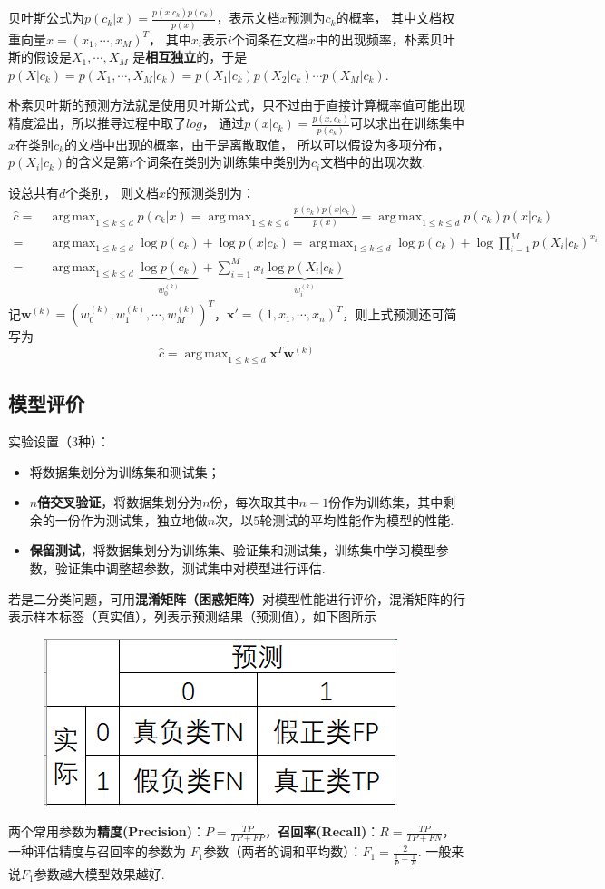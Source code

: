 \documentclass[12pt, a4paper, oneside]{ctexart}
\numberwithin{equation}{section}  %
\DeclareMathOperator*{\argmax}{arg\,max}  %
\let\leq=\leqslant %
\def\bd{\boldsymbol}        %
\def\add{\vspace{1ex}}      %
\begin{document}
贝叶斯公式为$p(c_k|x) = \frac{p(x|c_k)p(c_k)}{p(x)}$，\add 表示文档$x$预测为$c_k$的概率，
其中文档权重向量$x = (x_1,\cdots,x_M)^T$，
其中$x_i$表示$i$个词条在文档$x$中的出现频率，朴素贝叶斯的假设是$X_1,\cdots,X_M$
是\textbf{相互独立}的，于是$p(X|c_k) = p(X_1,\cdots,X_M|c_k) = p(X_1|c_k)p(X_2|c_k)\cdots p(X_M|c_k)$.

朴素贝叶斯的预测方法就是使用贝叶斯公式，\add 只不过由于直接计算概率值可能出现精度溢出，所以推导过程中取了$log$，
通过$p(x|c_k) = \frac{p(x,c_k)}{p(c_k)}$\add 可以求出在训练集中$x$在类别$c_k$的文档中出现的概率，由于是离散取值，
所以可以假设为多项分布，$p(X_i|c_k)$的含义是第$i$个词条在类别为训练集中类别为$c_i$文档中的出现次数.

设总共有$d$个类别，
则文档$x$的预测类别为：
\begin{align*}
    \hat{c} =&\ \argmax_{1\leq k\leq d}p(c_k|x) = \argmax_{1\leq k\leq d}\frac{p(c_k)p(x|c_k)}{p(x)} = \argmax_{1\leq k\leq d}p(c_k)p(x|c_k)\\
    =&\ \argmax_{1\leq k\leq d}\log p(c_k) + \log p(x|c_k) = \argmax_{1\leq k\leq d}\log p(c_k) + \log\prod_{i=1}^Mp(X_i|c_k)^{x_i}\\
    =&\ \argmax_{1\leq k\leq d}\underbrace{\log p(c_k)}_{w_0^{(k)}} + \sum_{i=1}^Mx_i\underbrace{\log p(X_i|c_k)}_{w_i^{(k)}}
\end{align*}
记$\bd{w}^{(k)} = (w_0^{(k)}, w_1^{(k)},\cdots, w_M^{(k)})^T$，$\bd{x}'=(1,x_1,\cdots,x_n)^T$，则上式预测还可简写为
\begin{equation*}
    \hat{c} = \argmax_{1\leq k\leq d}\bd{x}^T\bd{w}^{(k)}
\end{equation*}
\subsection{模型评价}
实验设置（3种）：
\begin{itemize}
    \item 将数据集划分为训练集和测试集；
    \item \textbf{$n$倍交叉验证}，将数据集划分为$n$份，每次取其中$n-1$份作为训练集，其中剩余的一份作为测试集，独立地做$n$次，以$5$轮测试的平均性能作为模型的性能.
    \item \textbf{保留测试}，将数据集划分为训练集、验证集和测试集，训练集中学习模型参数，验证集中调整超参数，测试集中对模型进行评估.
\end{itemize}
若是二分类问题，可用\textbf{混淆矩阵（困惑矩阵）}对模型性能进行评价，混淆矩阵的行表示样本标签（真实值），列表示预测结果（预测值），如下图所示
\begin{figure}[htbp]
    \centering
    \includegraphics[scale=1.6]{混淆矩阵.png}
\end{figure}

两个常用参数为\textbf{精度(Precision)}：$P = \frac{TP}{TP+FP}$，\textbf{召回率(Recall)}：$R = \frac{TP}{TP+FN}$，一种评估精度与召回率的参数为
$F_1$参数（两者的调和平均数）：$F_1 = \frac{2}{\frac{1}{P}+\frac{1}{R}}$. 一般来说$F_1$参数越大模型效果越好.
\end{document}
